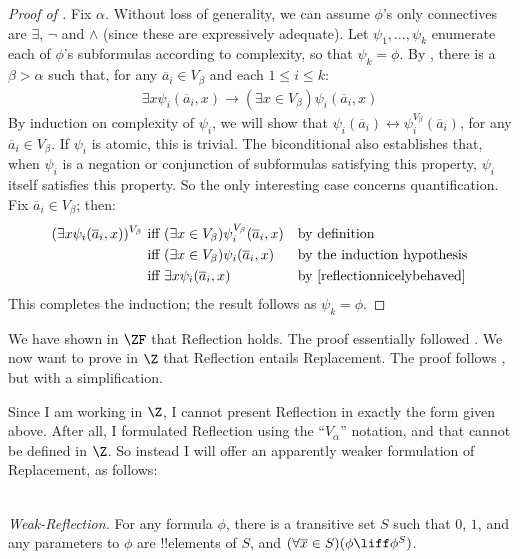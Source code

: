 \documentclass[../../../include/open-logic-section]{subfiles}
\begin{document}
\begin{proof}[Proof of ]
	Fix $\alpha$. Without loss of generality, we can assume $\phi$'s only connectives are $\exists$, $\lnot$ and $\land$ (since these are expressively adequate). Let $\psi_1, \ldots, \psi_k$ enumerate each of $\phi$'s subformulas according to complexity, so that $\psi_k = \phi$. By , there is a $\beta > \alpha$ such that, for any $\overline{a}_i \in V_\beta$ and each $1 \leq i \leq k$:
	\begin{align}\label{reflectionnicelybehaved}
		\exists x\psi_i(\overline{a}_i, x) \rightarrow (\exists x \in V_\beta) \psi_i(\overline{a}_i, x)\tag{*}
	\end{align}
	By induction on complexity of $\psi_i$, we will show that $\psi_i(\overline{a}_i) \leftrightarrow \psi_i^{V_\beta}(\overline{a}_i)$, for any  $\overline{a}_i \in V_\beta$. 	If $\psi_i$ is atomic, this is trivial. The biconditional also establishes that, when $\psi_i$ is a negation or conjunction of subformulas satisfying this property, $\psi_i$ itself satisfies this property. So the only interesting case concerns quantification. Fix $\overline{a}_i \in V_\beta$; then:
	\begin{align*}
		(\exists x \psi_i(\overline{a}_i, x))^{V_\beta}
		&\text{ iff }
		(\exists x \in V_\beta)\psi_i^{V_\beta}(\overline{a}_i, x)
		&&\text{by definition}\\
		&\text{ iff }
		(\exists x \in V_\beta)\psi_i(\overline{a}_i,  x)
		&&\text{by the induction hypothesis}\\
		&\text{ iff }
		\exists x \psi_i(\overline{a}_i, x)
		&&\text{by \eqref{reflectionnicelybehaved}}
	\end{align*}
	This completes the induction; the result follows as $\psi_k = \phi$.
\end{proof}\noindent
We have shown in $\ZF$ that Reflection holds. The proof essentially followed \citet{Montague1961}. We now want to prove in $\Z$ that Reflection entails Replacement. The proof follows \citet{Levy1960}, but with a simplification. 

Since I am working in $\Z$, I cannot present Reflection in exactly the form given above. After all, I formulated Reflection using the ``$V_\alpha$'' notation, and that cannot be defined in $\Z$. So instead I will offer an apparently weaker formulation of Replacement, as follows:

\
\\\emph{Weak-Reflection.} For any formula $\phi$, there is a transitive set $S$ such that
$0$, $1$, and any parameters to $\phi$ are !!{element}s of $S$, and $(\forall \overline{x} \in S)(\phi \liff \phi^S)$.
\end{document}
